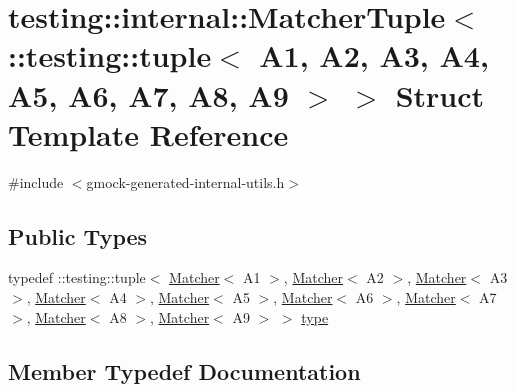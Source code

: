 \hypertarget{structtesting_1_1internal_1_1_matcher_tuple_3_01_1_1testing_1_1tuple_3_01_a1_00_01_a2_00_01_a3_05ce0d9708ffc0cc1f9fec180f9f8202e}{}\section{testing\+::internal\+::Matcher\+Tuple$<$ \+::testing\+::tuple$<$ A1, A2, A3, A4, A5, A6, A7, A8, A9 $>$ $>$ Struct Template Reference}
\label{structtesting_1_1internal_1_1_matcher_tuple_3_01_1_1testing_1_1tuple_3_01_a1_00_01_a2_00_01_a3_05ce0d9708ffc0cc1f9fec180f9f8202e}


{\ttfamily \#include $<$gmock-\/generated-\/internal-\/utils.\+h$>$}

\subsection*{Public Types}
\begin{DoxyCompactItemize}
\item 
typedef \+::testing\+::tuple$<$ \mbox{\hyperlink{classtesting_1_1_matcher}{Matcher}}$<$ A1 $>$, \mbox{\hyperlink{classtesting_1_1_matcher}{Matcher}}$<$ A2 $>$, \mbox{\hyperlink{classtesting_1_1_matcher}{Matcher}}$<$ A3 $>$, \mbox{\hyperlink{classtesting_1_1_matcher}{Matcher}}$<$ A4 $>$, \mbox{\hyperlink{classtesting_1_1_matcher}{Matcher}}$<$ A5 $>$, \mbox{\hyperlink{classtesting_1_1_matcher}{Matcher}}$<$ A6 $>$, \mbox{\hyperlink{classtesting_1_1_matcher}{Matcher}}$<$ A7 $>$, \mbox{\hyperlink{classtesting_1_1_matcher}{Matcher}}$<$ A8 $>$, \mbox{\hyperlink{classtesting_1_1_matcher}{Matcher}}$<$ A9 $>$ $>$ \mbox{\hyperlink{structtesting_1_1internal_1_1_matcher_tuple_3_01_1_1testing_1_1tuple_3_01_a1_00_01_a2_00_01_a3_05ce0d9708ffc0cc1f9fec180f9f8202e_a022b424844dde9c01e4e40716be48f9f}{type}}
\end{DoxyCompactItemize}


\subsection{Member Typedef Documentation}
\mbox{\label{structtesting_1_1internal_1_1_matcher_tuple_3_01_1_1testing_1_1tuple_3_01_a1_00_01_a2_00_01_a3_05ce0d9708ffc0cc1f9fec180f9f8202e_a022b424844dde9c01e4e40716be48f9f}} 
